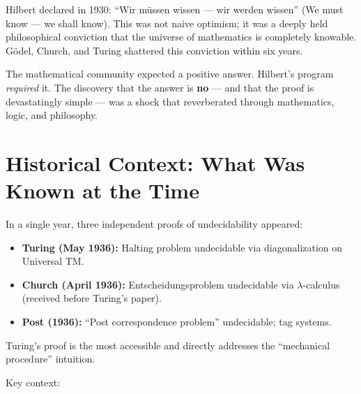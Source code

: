 Hilbert declared in 1930: ``Wir m\"ussen wissen — wir werden wissen'' (We must know — we shall know). This was not naive optimism; it was a deeply held philosophical conviction that the universe of mathematics is completely knowable. G\"odel, Church, and Turing shattered this conviction within six years.

The mathematical community expected a positive answer. Hilbert's program \emph{required} it. The discovery that the answer is \textbf{no} — and that the proof is devastatingly simple — was a shock that reverberated through mathematics, logic, and philosophy.

\section{Historical Context: What Was Known at the Time}
\label{sec:halting:context}

In a single year, three independent proofs of undecidability appeared:
\begin{itemize}
\item \textbf{Turing (May 1936):} Halting problem undecidable via diagonalization on Universal TM.
\item \textbf{Church (April 1936):} Entscheidungsproblem undecidable via $\lambda$-calculus (received before Turing's paper).
\item \textbf{Post (1936):} ``Post correspondence problem'' undecidable; tag systems.
\end{itemize}
Turing's proof is the most accessible and directly addresses the ``mechanical procedure'' intuition.

Key context:

